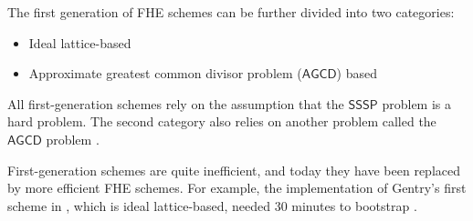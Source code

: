 The first generation of FHE schemes can be further divided into two categories:
\begin{itemize}
    \item Ideal lattice-based
    \item Approximate greatest common divisor problem ($\mathsf{AGCD}$) based
\end{itemize}

All first-generation schemes rely on the assumption that the $\mathsf{SSSP}$ problem is a hard problem. The second category also relies on another problem called the $\mathsf{AGCD}$ problem \cite{cite:QianFHE}.

First-generation schemes are quite inefficient, and today they have been replaced by more efficient FHE schemes. For example, the implementation of Gentry's first scheme in \cite{cite:gentry1}, which is ideal lattice-based, needed 30 minutes to bootstrap \cite{cite:gentry_impl}.



